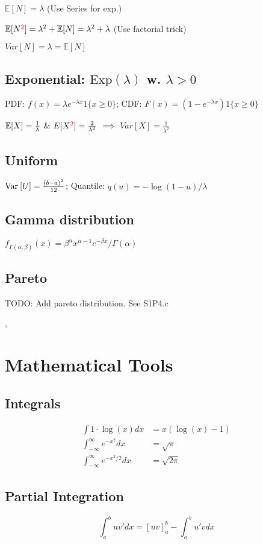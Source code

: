 $\mathbb{E}[N] = \lambda$ (Use Series for exp.)

$\mathbb{E}[N^{\textcolor{red}{2}}] = \lambda^2 + \mathbb{E}[N] = \lambda^2 +  \lambda$ (Use factorial trick)

$Var[N] = \lambda = \mathbb{E}[N]$

\subsection*{Exponential: $\text{Exp}(\lambda)$ w. $\lambda>0$}

PDF: $f(x) = \lambda e^{-\lambda x} 1\{ x \geq 0 \}$; CDF: $F(x) = (1- e^{-\lambda x}) 1\{ x \geq 0 \}$

$\mathbb{E}[X] = \frac{1}{\lambda}$ \& $E[X^{\textcolor{red}{2}}] = \frac{2}{\lambda^2}$ $\implies$ $Var[X] = \frac{1}{\lambda^2}$


\subsection*{Uniform}
$\operatorname{Var}_{}\left[ U \right]=\frac{(b-a)^2}{12}$; Quantile: $q(u)=-\log(1-u)/\lambda$


\subsection*{Gamma distribution}
$f_{\Gamma(\alpha,\beta)}(x)=\beta^\alpha x^{\alpha-1}e^{-\beta x}/\Gamma (\alpha)$

\subsection*{Pareto}
TODO: Add pareto distribution. See S1P4.c

\sep

\section*{Mathematical Tools}
\subsection*{Integrals}
\begin{align*}
    \int 1\cdot \log(x) dx &= x(\log(x)-1) \\
    \int_{-\infty}^\infty e^{-x^2} dx &= \sqrt{\pi} \\
    \int_{-\infty}^\infty e^{-x^2/2} dx &= \sqrt{2\pi}
\end{align*}

\subsection*{Partial Integration}
\[
  \int_a^b u v' dx = [u v]^b_a - \int_a^b u' v dx
\]

